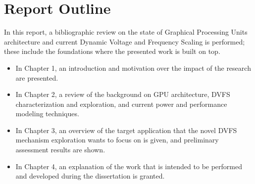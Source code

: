 \section{Report Outline}

In this report, a bibliographic review on the state of Graphical Processing Units architecture and current Dynamic Voltage and Frequency Scaling is performed; these include the foundations where the presented work is built on top. 

\begin{itemize}
\item In Chapter 1, an introduction and motivation over the impact of the research are presented.
\item In Chapter 2, a review of the background on GPU architecture, DVFS characterization and exploration, and current power and performance modeling techniques.
\item In Chapter 3, an overview of the target application that the novel DVFS mechanism exploration wants to focus on is given, and preliminary assessment results are shown.
\item In Chapter 4, an explanation of the work that is intended to be performed and developed during the dissertation is granted.

\end{itemize}